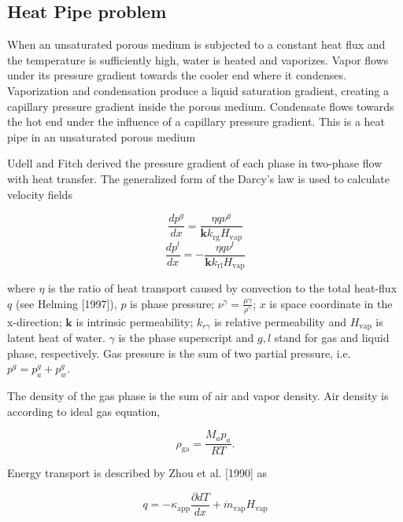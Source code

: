\subsection{Heat Pipe problem}
When an unsaturated porous medium is subjected to a constant heat flux and the temperature is sufficiently high, water is heated and vaporizes. Vapor flows under its pressure gradient towards the cooler end where it condenses. Vaporization and condensation produce a liquid saturation gradient, creating a capillary pressure gradient inside the porous medium. Condensate flows towards the hot end under the influence of a capillary pressure gradient. This is a heat pipe in an unsaturated porous medium

Udell and Fitch derived the pressure gradient of each phase in two-phase flow with heat transfer. The generalized form of the Darcy's law is used to calculate velocity fields

\begin{equation}
\frac{d p^g}{d x} = \frac{\eta q \nu^g}{\mathbf k k_{\mathrm {rg}} H_{\mathrm {vap}}}
\label{eq:HP1}
\end{equation}
\begin{equation}
\frac{d p^l}{d x} =- \frac{\eta q \nu^l}{\mathbf k k_{\mathrm {rl}} H_{\mathrm {vap}}}
\label{eq:HP2}
\end{equation}

where $\eta$ is the ratio of heat transport caused by convection to the total heat-flux $q$ (see Helming [1997]), $p$ is phase pressure; $\nu^\gamma=\frac{\mu\gamma}{\rho^\gamma}$; $x$ is space coordinate in the x-direction; $\mathbf k$ is intrinsic permeability; $k_{r\gamma}$ is relative permeability and $H_{\mathrm {vap}}$ is latent heat of water. $\gamma$ is the phase superscript and $g, l$ stand for gas and liquid phase, respectively. Gas pressure is the sum of two partial pressure, i.e. $p^g=p^g_a+p^g_w$.

The density of the gas phase is the sum of air and vapor density. Air density is according to ideal gas equation,

\begin{equation}
\rho_{\mathrm {ga}}=\frac{M_a p_a}{RT}.
\label{eq:HP3}
\end{equation}

Energy transport is described by Zhou et al. [1990] as

\begin{equation}
q=-\kappa_{\mathrm {app}}\frac{\partial d T}{d x} + \dot m_{\mathrm {vap}} H_{\mathrm {vap}}
\label{eq:HP4}
\end{equation}

